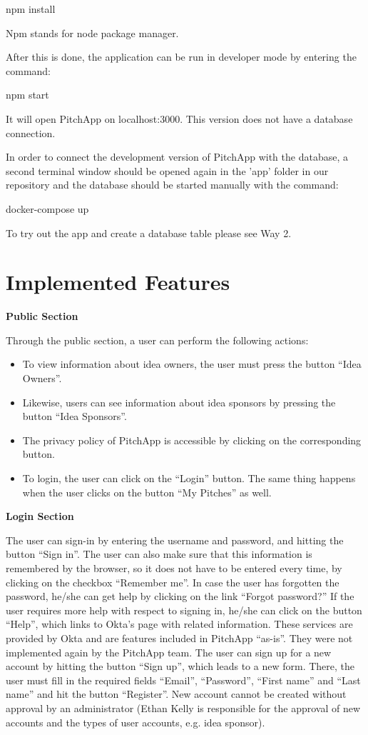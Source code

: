 npm install

Npm stands for node package manager.

After this is done, the application can be run in developer mode by entering the command:

npm start

It will open PitchApp on localhost:3000. This version does not have a database connection.

In order to connect the development version of PitchApp with the database, a second terminal window should be opened again in the 'app' folder in our repository and the database should be started manually with the command:

docker-compose up

To try out the app and create a database table please see Way 2.

\section{Implemented Features}

\textbf{Public Section}

Through the public section, a user can perform the following actions:

\begin{itemize}

\item To view information about idea owners, the user must press the button “Idea Owners”.
\item Likewise, users can see information about idea sponsors by pressing the button “Idea Sponsors”.
\item The privacy policy of PitchApp is accessible by clicking on the corresponding button.
\item To login, the user can click on the “Login” button. The same thing happens when the user clicks on the button “My Pitches” as well.

\end{itemize}

\textbf{Login Section}

The user can sign-in by entering the username and password, and hitting the button “Sign in”.
The user can also make sure that this information is remembered by the browser, so it does not have to be entered every time, by clicking on the checkbox “Remember me”.
In case the user has forgotten the password, he/she can get help by clicking on the link “Forgot password?”
If the user requires more help with respect to signing in, he/she can click on the button “Help”, which links to Okta’s page with related information.
These services are provided by Okta and are features included in PitchApp “as-is”. They were not implemented again by the PitchApp team.
The user can sign up for a new account by hitting the button “Sign up”, which leads to a new form. There, the user must fill in the required fields “Email”, “Password”, “First name” and “Last name” and hit the button “Register”.
New account cannot be created without approval by an administrator (Ethan Kelly is responsible for the approval of new accounts and the types of user accounts, e.g. idea sponsor).


